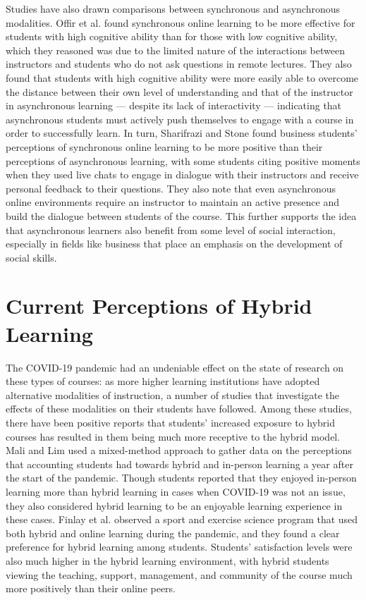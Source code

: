 Studies have also drawn comparisons between synchronous and asynchronous modalities. Offir et al. \cite{offir2008surface} found synchronous online learning to be more effective for students with high cognitive ability than for those with low cognitive ability, which they reasoned was due to the limited nature of the interactions between instructors and students who do not ask questions in remote lectures. They also found that students with high cognitive ability were more easily able to overcome the distance between their own level of understanding and that of the instructor in asynchronous learning — despite its lack of interactivity — indicating that asynchronous students must actively push themselves to engage with a course in order to successfully learn. In turn, Sharifrazi and Stone \cite{sharifrazi2019students} found business students’ perceptions of synchronous online learning to be more positive than their perceptions of asynchronous learning, with some students citing positive moments when they used live chats to engage in dialogue with their instructors and receive personal feedback to their questions. They also note that even asynchronous online environments require an instructor to maintain an active presence and build the dialogue between students of the course. This further supports the idea that asynchronous learners also benefit from some level of social interaction, especially in fields like business that place an emphasis on the development of social skills.

\section{Current Perceptions of Hybrid Learning}

The COVID-19 pandemic had an undeniable effect on the state of research on these types of courses: as more higher learning institutions have adopted alternative modalities of instruction, a number of studies that investigate the effects of these modalities on their students have followed. Among these studies, there have been positive reports that students' increased exposure to hybrid courses has resulted in them being much more receptive to the hybrid model. Mali and Lim \cite{mali2021students} used a mixed-method approach to gather data on the perceptions that accounting students had towards hybrid and in-person learning a year after the start of the pandemic. Though students reported that they enjoyed in-person learning more than hybrid learning in cases when COVID-19 was not an issue, they also considered hybrid learning to be an enjoyable learning experience in these cases. Finlay et al. \cite{finlay2022virtual} observed a sport and exercise science program that used both hybrid and online learning during the pandemic, and they found a clear preference for hybrid learning among students. Students' satisfaction levels were also much higher in the hybrid learning environment, with hybrid students viewing the teaching, support, management, and community of the course much more positively than their online peers.

